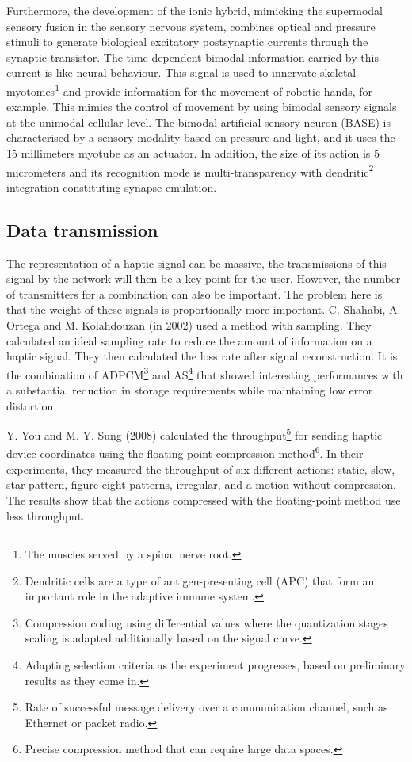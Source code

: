 \documentclass[12pt, a4paper]{article}
\begin{document}
\begin{multicols}{2}
Furthermore, the development of the ionic hybrid, mimicking the supermodal sensory fusion in the sensory nervous system, combines optical and pressure stimuli to generate biological excitatory postsynaptic currents through the synaptic transistor. The time-dependent bimodal information carried by this current is like neural behaviour. This signal is used to innervate skeletal myotomes\footnote{The muscles served by a spinal nerve root.} and provide information for the movement of robotic hands, for example. This mimics the control of movement by using bimodal sensory signals at the unimodal cellular level.
The bimodal artificial sensory neuron (BASE) is characterised by a sensory modality based on pressure and light, and it uses the 15 millimeters myotube as an actuator. In addition, the size of its action is 5 micrometers and its recognition mode is multi-transparency with dendritic\footnote{Dendritic cells are a type of antigen-presenting cell (APC) that form an important role in the adaptive immune system.} integration constituting synapse emulation\cite{neural-haptic}.

\subsection{Data transmission}

The representation of a haptic signal can be massive, the transmissions of this signal by the network will then be a key point for the user. However, the number of transmitters for a combination can also be important. The problem here is that the weight of these signals is proportionally more important.
C. Shahabi, A. Ortega and M. Kolahdouzan (in 2002) used a method with sampling\cite{shahabi_comparison_2002}. They calculated an ideal sampling rate to reduce the amount of information on a haptic signal. They then calculated the loss rate after signal reconstruction. It is the combination of ADPCM\footnote{Compression coding using differential values where the quantization stages scaling is adapted additionally based on the signal curve.} and AS\footnote{Adapting selection criteria as the experiment progresses, based on preliminary results as they come in.} that showed interesting performances with a substantial reduction in storage requirements while maintaining low error distortion.

Y. You and M. Y. Sung (2008) calculated the throughput\footnote{Rate of successful message delivery over a communication channel, such as Ethernet or packet radio.} for sending haptic device coordinates using the floating-point compression method\footnote{Precise compression method that can require large data spaces.}\cite{you_haptic_2008}. In their experiments, they measured the throughput of six different actions: static, slow, star pattern, figure eight patterns, irregular, and a motion without compression. The results show that the actions compressed with the floating-point method use less throughput.


\end{multicols}
\end{document}
